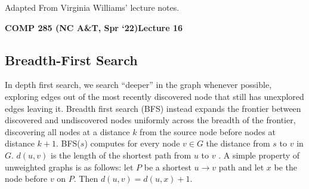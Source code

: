 \documentclass [12pt]{article}
\begin{document}
 

\vspace {1em} 
\begin {Instruction} 
Adapted From Virginia Williams' lecture notes.
\end {Instruction}  

{\LARGE \textbf {COMP 285 (NC A\&T, Spr `22)}\hfill \textbf {Lecture 16} } 

\begin{centering}
\section{Breadth-First Search}
 
 In depth first search, we search ``deeper'' in the graph whenever possible, exploring edges out of the most recently discovered node that still has unexplored edges leaving it. Breadth first search (BFS) instead expands the frontier between discovered and undiscovered nodes uniformly across the breadth of the frontier, discovering all nodes at a distance $k$ from the source node before nodes at distance $k + 1$. BFS($s$) computes for every node $v \in G$ the distance from $s$ to $v$ in $G$. $d(u, v )$ is the length of the shortest path from $u$ to $v$ . A simple property of unweighted graphs is as follows: let $P$ be a shortest $u \to v$ path and let $x$ be the node before $v$ on $P$. Then $d(u, v) = d(u, x) + 1$.


\begin{center}
\end{center}


\end{centering}
\end{document}
